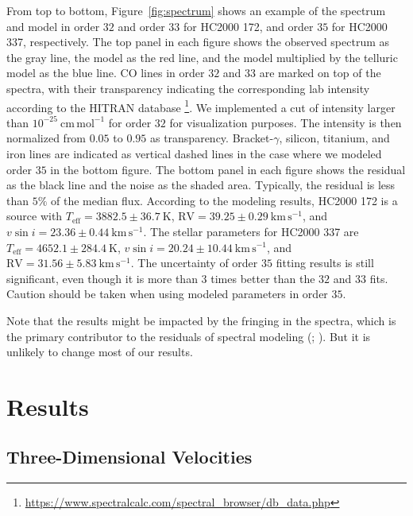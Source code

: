 \documentclass[12pt]{ucsddissertation}
\begin{document}
\begin{CJK*}{UTF8}{gbsn}
From top to bottom, Figure~\ref{fig:spectrum} shows an example of the spectrum and model in order $32$ and order $33$ for HC2000 172, and order $35$ for HC2000 337, respectively. The top panel in each figure shows the observed spectrum as the gray line, the model as the red line, and the model multiplied by the telluric model as the blue line. CO lines in order $32$ and $33$ are marked on top of the spectra, with their transparency indicating the corresponding lab intensity according to the HITRAN database \footnote{\url{https://www.spectralcalc.com/spectral_browser/db_data.php}}. We implemented a cut of intensity larger than $10^{-25}~\mathrm{cm}\,\mathrm{mol}^{-1}$ for order $32$ for visualization purposes. The intensity is then normalized from $0.05$ to $0.95$ as transparency. Bracket-$\gamma$, silicon, titanium, and iron lines are indicated as vertical dashed lines in the case where we modeled order $35$ in the bottom figure. The bottom panel in each figure shows the residual as the black line and the noise as the shaded area. Typically, the residual is less than $5\%$ of the median flux. According to the modeling results, HC2000 172 is a source with $T_\mathrm{eff}=3882.5\pm36.7~\mathrm{K}$, $\mathrm{RV}=39.25\pm0.29~\mathrm{km}\,\mathrm{s}^{-1}$, and $v\sin{i}=23.36\pm0.44~\mathrm{km}\,\mathrm{s}^{-1}$. The stellar parameters for HC2000 337 are $T_\mathrm{eff}=4652.1\pm284.4~\mathrm{K}$, $v\sin{i}=20.24\pm10.44~\mathrm{km}\, \mathrm{s}^{-1}$, and $\mathrm{RV}=31.56\pm5.83~\mathrm{km}\, \mathrm{s}^{-1}$. The uncertainty of order $35$ fitting results is still significant, even though it is more than $3$ times better than the $32$ and $33$ fits. Caution should be taken when using modeled parameters in order $35$.

Note that the results might be impacted by the fringing in the spectra, which is the primary contributor to the residuals of spectral modeling (\citealt{Hsu-2021-paper}; ). But it is unlikely to change most of our results.

\section{Results}
\label{onc-sec:results}

\subsection{Three-Dimensional Velocities}
\label{onc-subsec:3d velocities}


\end{CJK*}
\end{document}
